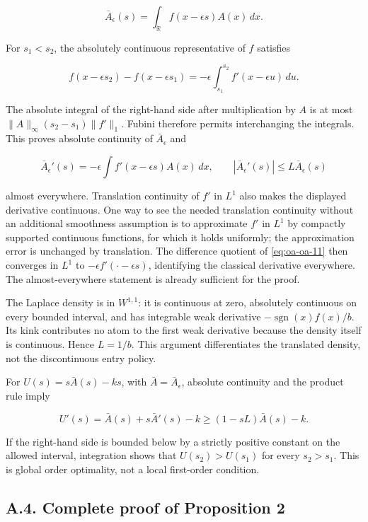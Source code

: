 \documentclass[
  11pt,
]{article}
\begin{document}
\[
\bar A_\epsilon(s)=\int_{\mathbb R}f(x-\epsilon s)A(x)\,dx.
\tag{OA.10}\label{eq:oa-oa-10}
\]

For \(s_1<s_2\), the absolutely continuous representative of \(f\)
satisfies

\[
f(x-\epsilon s_2)-f(x-\epsilon s_1)
=-\epsilon\int_{s_1}^{s_2}f'(x-\epsilon u)\,du.
\tag{OA.11}\label{eq:oa-oa-11}
\]

The absolute integral of the right-hand side after multiplication by
\(A\) is at most \(\|A\|_\infty(s_2-s_1)\|f'\|_1\). Fubini therefore
permits interchanging the integrals. This proves absolute continuity of
\(\bar A_\epsilon\) and

\[
\bar A_\epsilon'(s)=-\epsilon\int f'(x-\epsilon s)A(x)\,dx,
\qquad |\bar A_\epsilon'(s)|\le L \bar A_\epsilon(s)
\tag{OA.12}\label{eq:oa-oa-12}
\]

almost everywhere. Translation continuity of \(f'\) in \(L^1\) also
makes the displayed derivative continuous. One way to see the needed
translation continuity without an additional smoothness assumption is to
approximate \(f'\) in \(L^1\) by compactly supported continuous
functions, for which it holds uniformly; the approximation error is
unchanged by translation. The difference quotient of \eqref{eq:oa-oa-11}
then converges in \(L^1\) to \(-\epsilon f'(\cdot-\epsilon s)\),
identifying the classical derivative everywhere. The almost-everywhere
statement is already sufficient for the proof.

The Laplace density is in \(W^{1,1}\): it is continuous at zero,
absolutely continuous on every bounded interval, and has integrable weak
derivative \(-\operatorname{sgn}(x)f(x)/b\). Its kink contributes no
atom to the first weak derivative because the density itself is
continuous. Hence \(L=1/b\). This argument differentiates the translated
density, not the discontinuous entry policy.

For \(U(s)=s\bar A(s)-ks\), with \(\bar A=\bar A_\epsilon\), absolute continuity and the
product rule imply

\[
U'(s)=\bar A(s)+s\bar A'(s)-k\ge(1-sL)\bar A(s)-k.
\tag{OA.13}\label{eq:oa-oa-13}
\]

If the right-hand side is bounded below by a strictly positive constant
on the allowed interval, integration shows that \(U(s_2)>U(s_1)\) for
every \(s_2>s_1\). This is global order optimality, not a local
first-order condition.

\subsection{A.4. Complete proof of Proposition 2}\label{oa-a-entry}
\end{document}
